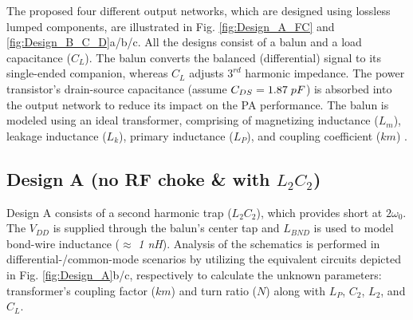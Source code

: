\documentclass[conference]{IEEEtran}
\begin{document}
The proposed four different  output networks, which are designed using lossless lumped components, are illustrated in Fig. \ref{fig:Design_A_FC} and \ref{fig:Design_B_C_D}a/b/c. 
All the designs consist of a balun and a load capacitance ($C_L$). The balun converts the balanced (differential) signal to its single-ended companion, whereas $C_L$ adjusts $3^{rd}$ harmonic impedance. The power transistor's drain-source capacitance (assume $C_{DS}=1.87\hspace{1mm}pF$) is absorbed into the output network to reduce its impact on the PA performance. The balun is modeled using an ideal transformer, comprising of magnetizing inductance ($L_m$), leakage inductance ($L_k$), primary inductance ($L_P$), and coupling coefficient ($km$) \cite{Transformer_model}. 

\subsection{Design A (no RF choke \& with $L_2C_2$)}
Design A consists of a second harmonic trap ($L_2C_2$), which provides short at $2\omega_0$. The $V_{DD}$ is  supplied through the balun's center tap and $L_{BND}$ is used to model bond-wire inductance ($\approx$ \textit{1 nH}).
Analysis of the schematics is performed in differential-/common-mode scenarios by utilizing the equivalent circuits depicted in Fig. \ref{fig:Design_A}b/c, respectively to calculate the unknown parameters: transformer's coupling factor ($km$) and turn ratio ($N$) along with  $L_P$, $C_2$, $L_2$, and $C_L$.
\end{document}
